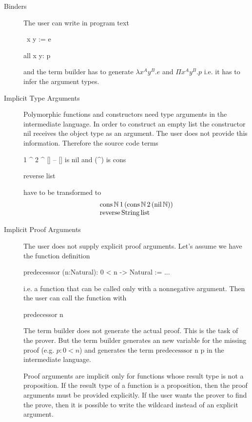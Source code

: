 \begin{description}

\item[Binders]
  The user can write in program text
  \begin{alba}
    \ x y := e

    all x y: p
  \end{alba}
  and the term builder has to generate $\lambda x^A y^B. e$ and $\Pi
  x^A y^B  . p$ i.e. it has to infer the argument types.


\item[Implicit Type Arguments]
  Polymorphic functions and constructors need type arguments in the
  intermediate language. In order to construct an empty list the constructor
  $\text{nil}$ receives the object type as an argument. The user does not
  provide this information. Therefore the source code terms
  \begin{alba}
    1 ^ 2 ^ []           -- [] is nil and (^) is cons

    reverse list
  \end{alba}
  have to be transformed to
  $$
  \begin{array}{l}
    \text{cons}\, \Natural\, 1 \,(\text{cons}\, \Natural\, 2\, (\text{nil}\,
    \Natural))

    \\

    \text{reverse}\, \text{String} \, \text{list}
  \end{array}
  $$


\item[Implicit Proof Arguments]
  The user does not supply explicit proof arguments. Let's assume we have the
  function definition
  \begin{alba}
    predecesssor (n:Natural): 0 < n -> Natural := ...
  \end{alba}
  i.e. a function that can be called only with a nonnegative argument. Then
  the user can call the function with
  \begin{alba}
    predecessor n
  \end{alba}
  The term builder does not generate the actual proof. This is the task of the
  prover. But the term builder generates an new variable for the missing proof
  (e.g. $p: 0 < n$) and generates the term $\text{predecesssor n p}$ in the
  intermediate language.

  Proof arguments are implicit only for functions whose result type is not a
  proposition. If the result type of a function is a proposition, then the
  proof arguments must be provided explicitly. If the user wants the prover to
  find the prove, then it is possible to write the wildcard \code{\_} instead
  of an explicit argument.



\end{description}

